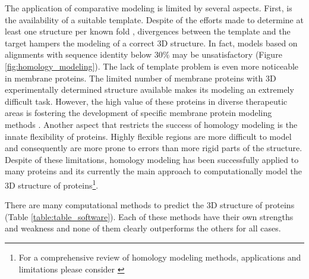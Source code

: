 \documentclass[11pt, b5paper,twoside]{tesi_upf}
\begin{document}
\par The application of comparative modeling is limited by several aspects. First, is the availability of a suitable template. Despite of the efforts made to determine at least one structure per known fold \cite{Norvell2007}, divergences between the template and the target hampers the modeling of a correct 3D structure. In fact, models based on alignments with sequence identity below 30$\%$ may be unsatisfactory (Figure \ref{fig:homology_modeling}). The lack of template problem is even more noticeable in membrane proteins. The limited number of membrane proteins with 3D experimentally determined structure available makes its modeling an extremely difficult task. However, the high value of these proteins in diverse therapeutic areas \cite{Du2012, Kampen2011} is fostering the development of specific membrane protein modeling methods \cite{Leman2015}. Another aspect that restricts the success of homology modeling is the innate flexibility of proteins. Highly flexible regions are more difficult to model and consequently are more prone to errors than more rigid parts of the structure. Despite of these limitations, homology modeling has been successfully applied to many proteins and its currently the main approach to computationally model the 3D structure of proteins\footnote{For a comprehensive review of homology modeling methods, applications and limitations please consider \cite{Marti-Renom2000, Malmstrom2010}}. 
\par There are many computational methods to predict the 3D structure of proteins (Table \ref{table:table_software}). Each of these methods have their own strengths and weakness and none of them clearly outperforms the others for all cases.
 
\renewcommand{\arraystretch}{1.2} %
\end{document}
